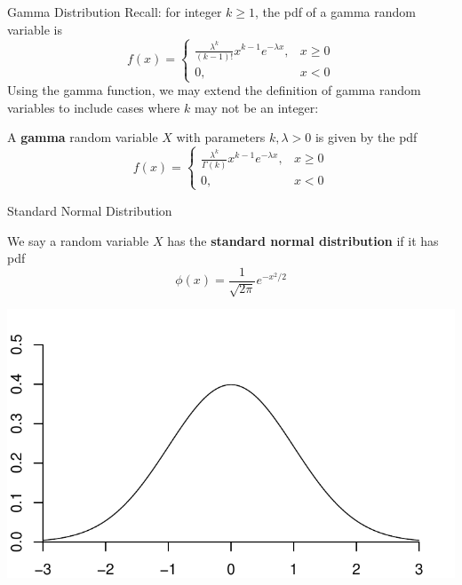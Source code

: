 \documentclass[handout]{beamer}
\renewcommand{\emph}{\textbf}
\begin{document}
\begin{frame}{Gamma Distribution}
Recall: for integer $k\geq 1$, the pdf of a gamma random variable is
$$f(x) =\begin{cases} \frac{\lambda^k}{(k-1)!}x^{k-1}e^{-\lambda x}, & x\geq 0 \\ 0, & x<0\end{cases}$$
\pause Using the gamma function, we may extend the definition of gamma random variables to include cases where $k$ may not be an integer:
\begin{block}{}
A \emph{gamma} random variable $X$ with parameters $k,\lambda>0$ is given by the pdf
$$f(x) = \begin{cases}\frac{\lambda^k}{\Gamma(k)}x^{k-1}e^{-\lambda x}, & x\geq 0 \\ 0, & x<0\end{cases}$$
\end{block}
\end{frame}


\begin{frame}{Standard Normal Distribution}
\begin{block}{}
We say a random variable $X$ has the \emph{standard normal distribution} if it has pdf
$$\phi(x)=\frac1{\sqrt{2\pi}}e^{-x^2/2}$$
\end{block}
\begin{center}
\includegraphics[scale=.5]{ch4_pdf_norm.pdf}
\end{center}
\end{frame}
\end{document}
